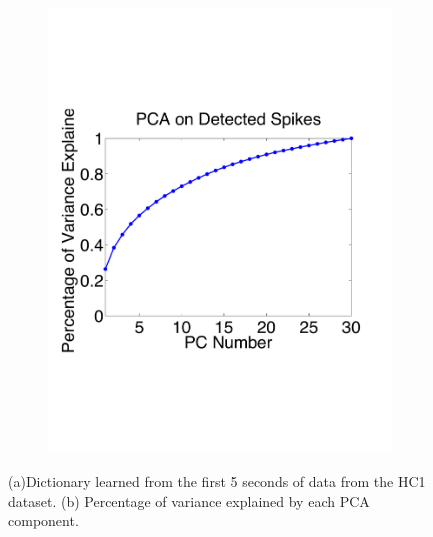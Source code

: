 \begin{center}
\begin{figure}[h!]
\begin{subfigure}[b]{.45\textwidth}
\includegraphics[width=1\textwidth]{../figs/supfigs/pcaenergy.pdf}
\caption{}
\label{fig:PCAenergy}
\end{subfigure}
\caption{(a)Dictionary learned from the first 5 seconds of data from the HC1 dataset. (b) Percentage of variance explained by each PCA component.
} \label{fig:dict}
\end{figure}
\end{center}

